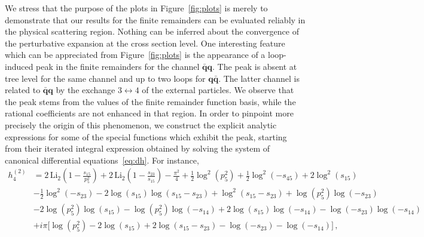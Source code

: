 \documentclass[main.tex]{subfiles}
\begin{document}
We stress that the purpose of the plots in Figure~\ref{fig:plots} is merely to demonstrate that our results for the finite remainders can be evaluated reliably in the physical scattering region. Nothing can be inferred about the convergence of the perturbative expansion at the cross section level. One interesting feature which can be appreciated from Figure~\ref{fig:plots} is the appearance of a loop-induced peak in the finite remainders for the channel $\mathbf{\bar{q}q}$. The peak is absent at tree level for the same channel and up to two loops for $\mathbf{q\bar{q}}$. The latter channel is related to $\mathbf{\bar{q}q}$ by the exchange $3\leftrightarrow 4$ of the external particles. We observe that the peak stems from the values of the finite remainder function basis, while the rational coefficients are not enhanced in that region. In order to pinpoint more precisely the origin of this phenomenon, we construct the explicit analytic expressions for some of the special functions which exhibit the peak, starting from their iterated integral expression obtained by solving the system of canonical differential equations~\eqref{eq:dh}. For instance,
\begin{equation} \label{eq:h24}
\begin{aligned}
h^{(2)}_4 & = 2 \, \text{Li}_2\left( 1 - \frac{s_{15}}{p_5^2} \right) + 2 \, \text{Li}_2 \left( 1- \frac{s_{23}}{s_{15}}\right) -\frac{\pi^2}{4} + \frac{1}{2} \log^2\left( p_5^2 \right) + \frac{1}{2}\log^2\left( -s_{45}\right) + 2 \log^2\left( s_{15}\right) \\
& - \frac{1}{2}\log^2\left( -s_{23}\right) - 2 \log\left( s_{15}\right) \log\left( s_{15} - s_{23}\right) + \log^2\left( s_{15} - s_{23}\right) + \log\left( p_5^2\right) \log\left(-s_{23}\right)  \\
& - 2 \log\left( p_5^2\right) \log\left(s_{15} \right)  - \log\left( p_5^2\right) \log\left( -s_{14}\right) +2 \log\left( s_{15}\right) \log\left( -s_{14}\right) 
 - \log\left(-s_{23}\right) \log\left( -s_{14}\right) \\
 & +i \pi \biggl[ \log\left( p_5^2\right) - 2 \log\left( s_{15}\right) + 2 \log\left( s_{15} - s_{23}\right) - \log\left( -s_{23}\right) - \log\left( -s_{14}\right)\biggr] \,,
\end{aligned}
\end{equation}
\end{document}
